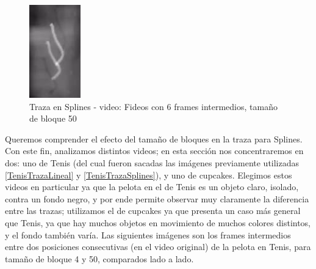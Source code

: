 \FloatBarrier
\begin{figure}[h]
\begin{center}
\caption{Traza en Splines - video: Fideos con 6 frames intermedios, tama\~no de bloque 50}
\label{FideosSplinesTrazaArtifact}
\includegraphics[width=0.3\linewidth]{imagenes/cualitativos/FSTA.png}
\end{center}
\end{figure}
\FloatBarrier

\par Queremos comprender el efecto del tama\~no de bloques en la traza para Splines.
Con este fin, analizamos distintos videos; en esta secci\'on nos concentraremos en dos: uno de Tenis (del cual fueron sacadas las im\'agenes previamente utilizadas \ref{TenisTrazaLineal} y \ref{TenisTrazaSplines}), y uno de cupcakes.
Elegimos estos videos en particular ya que la pelota en el de Tenis es un objeto claro, isolado, contra un fondo negro, y por ende permite observar muy claramente la diferencia entre las trazas; 
utilizamos el de cupcakes ya que presenta un caso m\'as general que Tenis, ya que hay muchos objetos en movimiento de muchos colores distintos, y el fondo tambi\'en var\'ia.
Las siguientes im\'agenes son los frames intermedios entre dos posiciones consecutivas (en el video original) de la pelota en Tenis, para tama\~no de bloque 4 y 50, comparados lado a lado.


